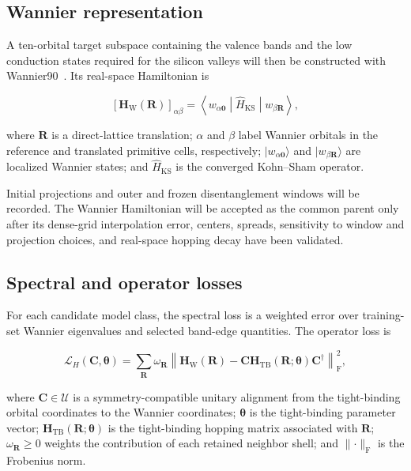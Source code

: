 \documentclass[preprint,12pt]{elsarticle}
\begin{document}
\subsection{Wannier representation}
\label{sec:wannier-representation}

A ten-orbital target subspace containing the valence bands and the low
conduction states required for the silicon valleys will then be constructed
with Wannier90~\cite{pizzi2020,souza2001}. Its real-space Hamiltonian is

\begin{equation}
\left[
\bm{H}_{\mathrm{W}}(\bm{R})
\right]_{\alpha\beta}
=
\left\langle
w_{\alpha\bm{0}}
\middle|
\hat{H}_{\mathrm{KS}}
\middle|
w_{\beta\bm{R}}
\right\rangle,
\label{eq:wannier-hamiltonian}
\end{equation}

where $\bm{R}$ is a direct-lattice translation; $\alpha$ and $\beta$ label
Wannier orbitals in the reference and translated primitive cells,
respectively; $\lvert w_{\alpha\bm{0}}\rangle$ and
$\lvert w_{\beta\bm{R}}\rangle$ are localized Wannier states; and
$\hat{H}_{\mathrm{KS}}$ is the converged Kohn--Sham operator.

Initial projections and outer and frozen disentanglement windows will be
recorded. The Wannier Hamiltonian will be accepted as the common parent only
after its dense-grid interpolation error, centers, spreads, sensitivity to
window and projection choices, and real-space hopping decay have been
validated.

\subsection{Spectral and operator losses}
\label{sec:losses}

For each candidate model class, the spectral loss is a weighted error over
training-set Wannier eigenvalues and selected band-edge quantities. The
operator loss is

\begin{equation}
\mathcal{L}_{H}(\bm{C},\bm{\theta})
=
\sum_{\bm{R}}
\omega_{\bm{R}}
\left\|
\bm{H}_{\mathrm{W}}(\bm{R})
-
\bm{C}
\bm{H}_{\mathrm{TB}}(\bm{R};\bm{\theta})
\bm{C}^{\dagger}
\right\|_{\mathrm{F}}^{2},
\label{eq:operator-loss}
\end{equation}

where $\bm{C}\in\mathcal{U}$ is a symmetry-compatible unitary alignment from
the tight-binding orbital coordinates to the Wannier coordinates;
$\bm{\theta}$ is the tight-binding parameter vector;
$\bm{H}_{\mathrm{TB}}(\bm{R};\bm{\theta})$ is the tight-binding hopping
matrix associated with $\bm{R}$; $\omega_{\bm{R}}\geq 0$ weights the
contribution of each retained neighbor shell; and $\lVert\cdot\rVert_{\mathrm F}$
is the Frobenius norm.
\end{document}
